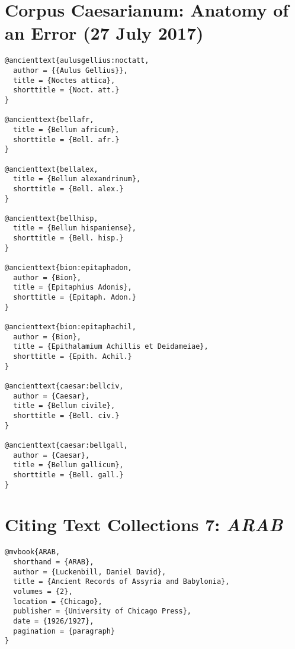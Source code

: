 \documentclass[a4paper]{article}
\begin{document}
\section{Corpus Caesarianum: Anatomy of an Error (27 July 2017)}

\begin{verbatim}
@ancienttext{aulusgellius:noctatt,
  author = {{Aulus Gellius}},
  title = {Noctes attica},
  shorttitle = {Noct. att.}
}

@ancienttext{bellafr,
  title = {Bellum africum},
  shorttitle = {Bell. afr.}
}

@ancienttext{bellalex,
  title = {Bellum alexandrinum},
  shorttitle = {Bell. alex.}
}

@ancienttext{bellhisp,
  title = {Bellum hispaniense},
  shorttitle = {Bell. hisp.}
}

@ancienttext{bion:epitaphadon,
  author = {Bion},
  title = {Epitaphius Adonis},
  shorttitle = {Epitaph. Adon.}
}

@ancienttext{bion:epitaphachil,
  author = {Bion},
  title = {Epithalamium Achillis et Deidameiae},
  shorttitle = {Epith. Achil.}
}

@ancienttext{caesar:bellciv,
  author = {Caesar},
  title = {Bellum civile},
  shorttitle = {Bell. civ.}
}

@ancienttext{caesar:bellgall,
  author = {Caesar},
  title = {Bellum gallicum},
  shorttitle = {Bell. gall.}
}
\end{verbatim}

\begin{verbcite}
  \nocite{aulusgellius:noctatt, bellafr, bellalex, bellhisp, bion:epitaphadon,
    bion:epitaphachil, caesar:bellciv, caesar:bellgall}
\end{verbcite}
\exampleabbreviations
{}

\section{Citing Text Collections 7: \emph{ARAB}}

\begin{verbatim}
@mvbook{ARAB,
  shorthand = {ARAB},
  author = {Luckenbill, Daniel David},
  title = {Ancient Records of Assyria and Babylonia},
  volumes = {2},
  location = {Chicago},
  publisher = {University of Chicago Press},
  date = {1926/1927},
  pagination = {paragraph}
}
\end{verbatim}
\end{document}
